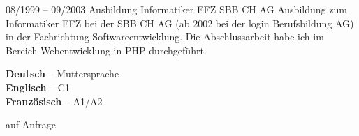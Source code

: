 \documentclass[10pt]{developercv} %
\begin{document}

\vspace{0.5cm} %

\begin{entrylist}
	\entry
	{\footnotesize 08/1999 -- 09/2003}
	{Ausbildung Informatiker EFZ}
	{SBB CH AG}
	{Ausbildung zum Informatiker EFZ bei der SBB CH AG (ab 2002 bei der login Berufsbildung AG) in der Fachrichtung Softwareentwicklung. Die Abschlussarbeit habe ich im Bereich Webentwicklung in PHP durchgeführt.}
\end{entrylist}


\vspace{0.5cm} %
\begin{minipage}[t]{0.45\textwidth} %
	\vspace{-\baselineskip} %


	\textbf{Deutsch} -- Muttersprache\\
	\textbf{Englisch} -- C1\\
	\textbf{Französisch} -- A1/A2
\end{minipage}
\hfill %
\begin{minipage}[t]{0.45\textwidth} %
	\vspace{-\baselineskip} %


	auf Anfrage
\end{minipage}

\end{document}
